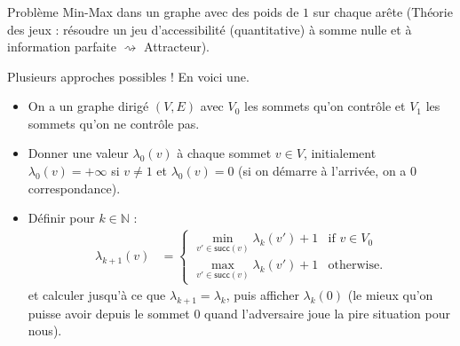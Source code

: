 \usetikzlibrary{overlay-beamer-styles}

\begin{frame}
    \frametitle{\problemtitle}
     \begin{block}{Problème}
        Min-Max dans un graphe avec des poids de $1$ sur chaque arête (Théorie des jeux : résoudre un jeu d'accessibilité (quantitative) à somme nulle et à information parfaite $\rightsquigarrow$ Attracteur).
    \end{block}
    Plusieurs approches possibles ! En voici une.
    \pause
    \begin{itemize}
       \item<+-> On a un graphe dirigé $(V,E)$ avec $V_0$ les sommets qu'on contrôle et $V_1$ les sommets qu'on ne contrôle pas.
       \item<+-> Donner une valeur $\lambda_0(v)$ à chaque sommet $v \in V$, initialement $\lambda_0(v) = +\infty$ si $v \neq 1$ et $\lambda_0(v) = 0$ (si on démarre à l'arrivée, on a 0 correspondance).
       \item<+-> Définir pour $k \in \mathbb{N}$ :
          \begin{align*}
          \lambda_{k+1}(v)&=\begin{cases}
              \underset{v'\in\mathsf{succ}(v)}{\min} \lambda_{k}(v')+1 &\text{if } v\in V_0\\
              \underset{v'\in\mathsf{succ}(v)}{\max} \lambda_{k}(v')+1 &\text{otherwise}.
          \end{cases}
          \end{align*}
          et calculer jusqu'à ce que $\lambda_{k+1} = \lambda_{k}$, puis afficher $\lambda_{k}(0)$ (le mieux qu'on puisse avoir depuis le sommet $0$ quand l'adversaire joue la pire situation pour nous).
     \end{itemize}
\end{frame}

